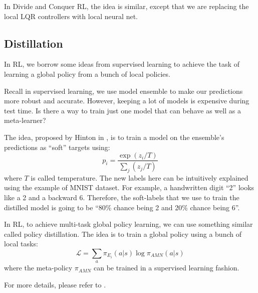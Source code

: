 In Divide and Conquer RL, the idea is similar, except that we are replacing the local LQR controllers with local neural net. 

\subsection{Distillation}
In RL, we borrow some ideas from supervised learning to achieve the task of learning a global policy from a bunch of local policies. 

Recall in supervised learning, we use model ensemble to make our predictions more robust and accurate. However, keeping a lot of models is expensive during test time. Is there a way to train just one model that can behave as well as a meta-learner?

The idea, proposed by Hinton in \cite{hinton2015distilling}, is to train a model on the ensemble's predictions as ``soft'' targets using:
\[
p_i = \frac{\exp(z_i/T)}{\sum_j (z_j/T)}
\]
where $T$ is called temperature. The new labels here can be intuitively explained using the example of MNIST dataset. For example, a handwritten digit ``2'' looks like a 2 and a backward 6. Therefore, the soft-labels that we use to train the distilled model is going to be ``80\% chance being 2 and 20\% chance being 6''.

In RL, to achieve multi-task global policy learning, we can use something similar called policy distillation. The idea is to train a global policy using a bunch of local tasks:
\[
\mathcal{L} =  \sum_a \pi_{E_i}(a|s)\log\pi_{AMN}(a|s)
\]
where the meta-policy $\pi_{AMN}$ can be trained in a supervised learning fashion. 

For more details, please refer to \cite{rusu2015policy, parisotto2015actor}.
